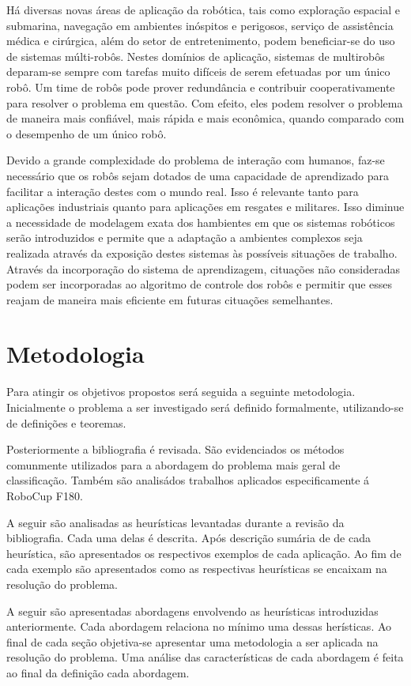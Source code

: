 Há diversas novas áreas de aplicação da robótica, tais como exploração espacial e submarina, navegação em ambientes inóspitos e perigosos, serviço de assistência médica
e cirúrgica, além do setor de entretenimento, podem beneficiar-se do uso de sistemas
múlti-robôs. Nestes domínios de aplicação, sistemas de multirobôs deparam-se sempre
com tarefas muito difíceis de serem efetuadas por um único robô. Um time de robôs pode
prover redundância e contribuir cooperativamente para resolver o problema em questão.
Com efeito, eles podem resolver o problema de maneira mais confiável, mais rápida e 
mais econômica, quando comparado com o desempenho de um único robô.

Devido a grande complexidade do problema de interação com humanos, faz-se necessário 
que os robôs sejam dotados de uma capacidade de aprendizado para facilitar a interação
destes com o mundo real. Isso é relevante tanto para aplicações industriais quanto para aplicações em resgates e militares. Isso diminue a necessidade de modelagem
exata dos hambientes em que os sistemas robóticos serão introduzidos e permite que
a adaptação a ambientes complexos seja realizada através da exposição destes sistemas
às possíveis situações de trabalho. Através da incorporação do sistema de
aprendizagem, cituações não consideradas podem ser incorporadas ao algoritmo de
controle dos robôs e permitir que esses reajam de maneira mais eficiente em futuras
cituações semelhantes.

\section{Metodologia}

Para atingir os objetivos propostos será seguida a seguinte metodologia.
Inicialmente o problema a ser investigado será definido formalmente, 
utilizando-se de definições e teoremas.

Posteriormente a bibliografia é revisada. São evidenciados os métodos comunmente
utilizados para a abordagem do problema mais geral de classificação. Também são
analisádos trabalhos aplicados especificamente á RoboCup F180.

A seguir são analisadas as heurísticas levantadas durante a
revisão da bibliografia. Cada uma delas é descrita. Após descrição sumária de
de cada heurística, são apresentados os respectivos exemplos de cada aplicação. Ao fim de cada exemplo são apresentados como as respectivas heurísticas se encaixam na
resolução do problema. 

A seguir são apresentadas abordagens envolvendo as heurísticas introduzidas anteriormente. Cada abordagem relaciona no mínimo uma dessas herísticas.
Ao final de cada seção objetiva-se apresentar uma metodologia a ser aplicada
na resolução do problema. Uma análise das características de cada abordagem
é feita ao final da definição cada abordagem.

